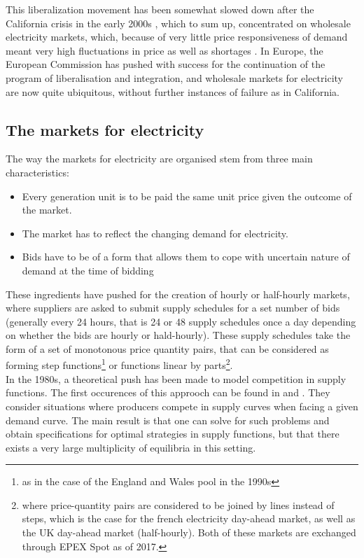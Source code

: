 This liberalization movement has been somewhat slowed down after the California crisis in the early 2000s \cite{jamasb2005electricity}, which to sum up, concentrated on wholesale electricity markets, which, because of very little price responsiveness of demand meant very high fluctuations in price as well as shortages \cite{borenstein2002trouble}. In Europe, the European Commission has pushed with success for the continuation of the program of liberalisation and integration, and wholesale markets for electricity are now quite ubiquitous, without further instances of failure as in California. 

\subsection*{The markets for electricity}
The way the markets for electricity are organised stem from three main characteristics:
\begin{itemize}
\item Every generation unit is to be paid the same unit price given the outcome of the market.
\item The market has to reflect the changing demand for electricity.
\item Bids have to be of a form that allows them to cope with uncertain nature of demand at the time of bidding
\end{itemize}

These ingredients have pushed for the creation of hourly or half-hourly markets, where suppliers are asked to submit supply schedules for a set number of bids (generally every 24 hours, that is 24 or 48 supply schedules once a day depending on whether the bids are hourly or hald-hourly). These supply schedules take the form of a set of monotonous price quantity pairs, that can be considered as forming step functions\footnote{as in the case of the England and Wales pool in the 1990s} or functions linear by parts\footnote{where price-quantity pairs are considered to be joined by lines instead of steps, which is the case for the french electricity day-ahead market, as well as the UK day-ahead market (half-hourly). Both of these markets are exchanged through EPEX Spot as of 2017.}.\\

In the 1980s, a theoretical push has been made to model competition in supply functions. The first occurences of this approoch can be found in \cite{grossman1981nash} and \cite{hart1982imperfect}. They consider situations where producers compete in supply curves when facing a given demand curve. The main result is that one can solve for such problems and obtain specifications for optimal strategies in supply functions, but that there exists a very large multiplicity of equilibria in this setting.\\

